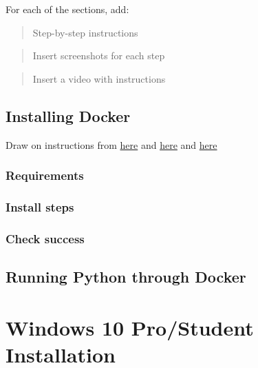\documentclass[
]{book}
\begin{document}
For each of the sections, add:

\begin{quote}
Step-by-step instructions
\end{quote}

\begin{quote}
Insert screenshots for each step
\end{quote}

\begin{quote}
Insert a video with instructions
\end{quote}

\hypertarget{installing-docker}{%
\section*{Installing Docker}\label{installing-docker}}

Draw on instructions from \href{https://gdsl-ul.github.io/the_knowledge/docker.html}{here} and \href{https://darribas.org/gds_env/guides/docker_install/}{here} and \href{https://darribas.org/gds_env/guides/docker_install/}{here}

\hypertarget{requirements}{%
\subsection*{Requirements}\label{requirements}}

\hypertarget{install-steps}{%
\subsection*{Install steps}\label{install-steps}}

\hypertarget{check-success}{%
\subsection*{Check success}\label{check-success}}

\hypertarget{running-python-through-docker}{%
\section*{Running Python through Docker}\label{running-python-through-docker}}

\hypertarget{windows-10-prostudent-installation}{%
\chapter*{Windows 10 Pro/Student Installation}\label{windows-10-prostudent-installation}}
\end{document}
